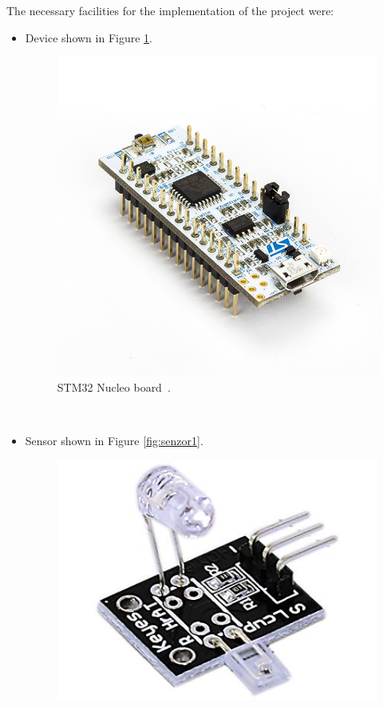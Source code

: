 \documentclass[11pt,a4paper]{article}
\begin{document}
The necessary facilities for the implementation of the project were:\\[-1.5em]
\begin{itemize}
    \item Device shown in Figure \ref{fig:oldplatform}.\\[-2em]
        \begin{figure}[H]
            \centering
            \includegraphics[scale=1.4]{img/device-old.jpg}
            \caption{STM32 Nucleo board~\cite{IMG-DEVICE-OLD}.}
            \label{fig:oldplatform}
        \end{figure}
        \hfill\\[-17mm]
    \item Sensor shown in Figure \ref{fig:senzor1}.
        \begin{figure}[H]
            \centering
            \includegraphics[scale=0.3]{img/sensor1.jpg}

\end{figure}
\end{itemize}
\end{document}
